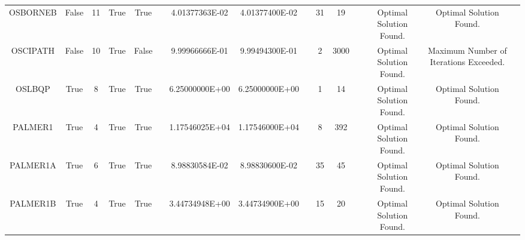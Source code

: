 \begin{longtable}{ccccccccccccccc}
	\cellcolor{default2} OSBORNEB& \cellcolor{default2} False& \cellcolor{default2} 11& \cellcolor{default2} True& \cellcolor{default2} True& \cellcolor{header} & \cellcolor{best} 4.01377363E-02& \cellcolor{ok} 4.01377400E-02& \cellcolor{header} & \cellcolor{ok} 31& \cellcolor{best} 19& \cellcolor{header} & \cellcolor{default2} Optimal Solution Found.& \cellcolor{default2} Optimal Solution Found.& \cellcolor{header} \\
	\cellcolor{default1} OSCIPATH& \cellcolor{default1} False& \cellcolor{default1} 10& \cellcolor{default1} True& \cellcolor{default1} False& \cellcolor{header} & \cellcolor{poor} 9.99966666E-01& \cellcolor{best} 9.99494300E-01& \cellcolor{header} & \cellcolor{best} 2& \cellcolor{poor} 3000& \cellcolor{header} & \cellcolor{default1} Optimal Solution Found.& \cellcolor{default1} Maximum Number of Iterations Exceeded.& \cellcolor{header} \\
	\cellcolor{default2} OSLBQP& \cellcolor{default2} True& \cellcolor{default2} 8& \cellcolor{default2} True& \cellcolor{default2} True& \cellcolor{header} & \cellcolor{best} 6.25000000E+00& \cellcolor{best} 6.25000000E+00& \cellcolor{header} & \cellcolor{best} 1& \cellcolor{poor} 14& \cellcolor{header} & \cellcolor{default2} Optimal Solution Found.& \cellcolor{default2} Optimal Solution Found.& \cellcolor{header} \\
	\cellcolor{default1} PALMER1& \cellcolor{default1} True& \cellcolor{default1} 4& \cellcolor{default1} True& \cellcolor{default1} True& \cellcolor{header} & \cellcolor{ok} 1.17546025E+04& \cellcolor{best} 1.17546000E+04& \cellcolor{header} & \cellcolor{best} 8& \cellcolor{poor} 392& \cellcolor{header} & \cellcolor{default1} Optimal Solution Found.& \cellcolor{default1} Optimal Solution Found.& \cellcolor{header} \\
	\cellcolor{default2} PALMER1A& \cellcolor{default2} True& \cellcolor{default2} 6& \cellcolor{default2} True& \cellcolor{default2} True& \cellcolor{header} & \cellcolor{best} 8.98830584E-02& \cellcolor{ok} 8.98830600E-02& \cellcolor{header} & \cellcolor{best} 35& \cellcolor{ok} 45& \cellcolor{header} & \cellcolor{default2} Optimal Solution Found.& \cellcolor{default2} Optimal Solution Found.& \cellcolor{header} \\
	\cellcolor{default1} PALMER1B& \cellcolor{default1} True& \cellcolor{default1} 4& \cellcolor{default1} True& \cellcolor{default1} True& \cellcolor{header} & \cellcolor{ok} 3.44734948E+00& \cellcolor{best} 3.44734900E+00& \cellcolor{header} & \cellcolor{best} 15& \cellcolor{ok} 20& \cellcolor{header} & \cellcolor{default1} Optimal Solution Found.& \cellcolor{default1} Optimal Solution Found.& \cellcolor{header} \\

\end{longtable}
